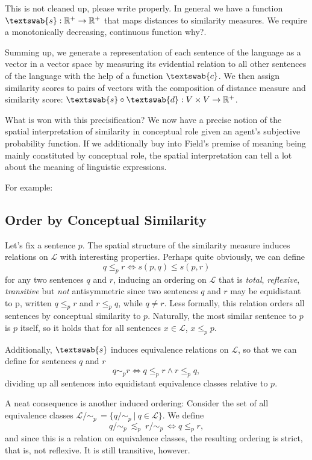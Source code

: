 \documentclass[11pt, a4paper]{scrartcl}
\renewcommand{\i}[1]{\emph{#1}}
\renewcommand{\L}{\mathcal{L}}
\newcommand{\m}[1]{\textswab{#1}}
\newcommand{\given}[1][]{\:#1\vert\:}
\begin{document}
{\color{red}This is not cleaned up, please write properly.}
In general we have a function ${\m{s}: \mathbb{R}^+ \rightarrow \mathbb{R}^+ }$ that maps distances to similarity measures. We require a monotonically decreasing, continuous function {\color{red} why?}. 

Summing up, we generate a representation of each sentence of the language as a vector in a vector space by measuring its evidential relation to all other sentences of the language with the help of a function $\m{c}$. We then assign similarity scores to pairs of vectors with the composition of distance measure and similarity score: ${\m{s}\circ \m{d} : V \times V \rightarrow \mathbb{R}^+}$.

What is won with this precisification? We now have a precise notion of the spatial interpretation of similarity in conceptual role given an agent's subjective probability function. If we additionally buy into Field's premise of meaning being mainly constituted by conceptual role, the spatial interpretation can tell a lot about the meaning of linguistic expressions. 

For example:

\subsection{Order by Conceptual Similarity}\label{sec:order}

Let's fix a sentence $p$. The spatial structure of the similarity measure induces relations on $\L$ with interesting properties. Perhaps quite obviously, we can define 
\[
    q \leqslant_p r \Leftrightarrow s(p,q) \leqslant s(p,r)
\]
for any two sentences $q$ and $r$, inducing an ordering on $\L$ that is \i{total}, \i{reflexive}, \i{transitive} but \i{not} antisymmetric since two sentences $q$ and $r$ may be equidistant to p, written $q \leqslant_p r$ and $r \leqslant_p q$, while $q \not = r$. Less formally, this relation orders all sentences by conceptual similarity to $p$. Naturally, the most similar sentence to $p$ is $p$ itself, so it holds that for all sentences ${x \in \L}$, ${x\leqslant_p p}$.

Additionally, $\m{s}$ induces equivalence relations on $\L$, so that we can define for sentences $q$ and $r$ 
\[
    q \sim_p r \Leftrightarrow q \leqslant_p r \land r \leqslant_p q,
\]
dividing up all sentences into equidistant equivalence classes relative to $p$.

A neat consequence is another induced ordering: Consider the set of all equivalence classes $\L/\!\sim_p\,=\{ q/\!\sim_p \given q\in \L \}$. We define   
\[
    q/\!\sim_p~\lesssim_p~r/\!\sim_p~\Leftrightarrow q \leqslant_p r, 
\]
and since this is a relation on equivalence classes, the resulting ordering is strict, that is, not reflexive. It is still transitive, however.
\end{document}
